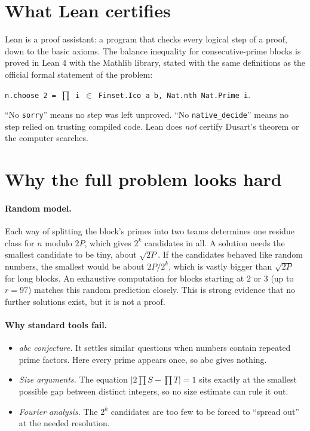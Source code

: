 \documentclass[11pt]{article}
\theoremstyle{definition}
\theoremstyle{remark}
\begin{document}
\section{What Lean certifies}

Lean is a proof assistant: a program that checks every logical step of a proof, down to
the basic axioms. The balance inequality for consecutive-prime blocks is proved in Lean 4
with the Mathlib library, stated with the same definitions as the official formal statement
of the problem:
\begin{center}
\texttt{n.choose 2 = $\prod$ i $\in$ Finset.Ico a b, Nat.nth Nat.Prime i}.
\end{center}
``No \texttt{sorry}'' means no step was left unproved. ``No \texttt{native\_decide}'' means
no step relied on trusting compiled code. Lean does \emph{not} certify Dusart's theorem or the
computer searches.

\section{Why the full problem looks hard}

\paragraph{Random model.} Each way of splitting the block's primes into two teams determines
one residue class for $n$ modulo $2P$, which gives $2^k$ candidates in all. A solution needs
the smallest candidate to be tiny, about $\sqrt{2P}$. If the candidates behaved like random
numbers, the smallest would be about $2P/2^k$, which is vastly bigger than $\sqrt{2P}$ for
long blocks. An exhaustive computation for blocks starting at $2$ or $3$ (up to $r = 97$)
matches this random prediction closely. This is strong evidence that no further solutions
exist, but it is not a proof.

\paragraph{Why standard tools fail.}
\begin{itemize}
\item \emph{abc conjecture.} It settles similar questions when numbers contain repeated prime
  factors. Here every prime appears once, so abc gives nothing.
\item \emph{Size arguments.} The equation $|2\prod S - \prod T| = 1$ sits exactly at the
  smallest possible gap between distinct integers, so no size estimate can rule it out.
\item \emph{Fourier analysis.} The $2^k$ candidates are too few to be forced to ``spread
  out'' at the needed resolution.
\end{itemize}
\end{document}
